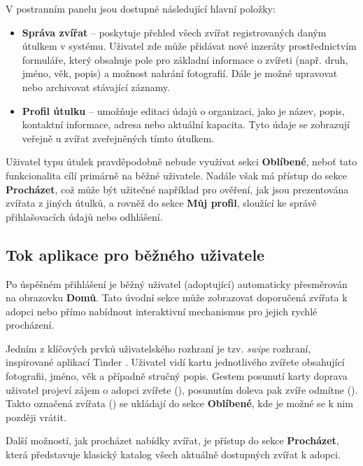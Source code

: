 \documentclass[czech, bp, kiv, he, iso690numb, pdf]{fasthesis}
\begin{document}
    \noindent V postranním panelu jsou dostupné následující hlavní položky:

    \begin{itemize}
        \item \textbf{Správa zvířat} – poskytuje přehled všech zvířat registrovaných daným útulkem v systému. Uživatel zde může přidávat nové inzeráty prostřednictvím formuláře, který obsahuje pole pro základní informace o zvířeti (např. druh, jméno, věk, popis) a možnost nahrání fotografií. Dále je možné upravovat nebo archivovat stávající záznamy.

        \item \textbf{Profil útulku} – umožňuje editaci údajů o organizaci, jako je název, popis, kontaktní informace, adresa nebo aktuální kapacita. Tyto údaje se zobrazují veřejně u zvířat zveřejněných tímto útulkem.
    \end{itemize}

    \noindent Uživatel typu útulek pravděpodobně nebude využívat sekci \textbf{Oblíbené}, neboť tato funkcionalita cílí primárně na běžné uživatele. Nadále však má přístup do sekce \textbf{Procházet}, což může být užitečné například pro ověření, jak jsou prezentována zvířata z jiných útulků, a rovněž do sekce \textbf{Můj profil}, sloužící ke správě přihlašovacích údajů nebo odhlášení.

    \subsection{Tok aplikace pro běžného uživatele}

    Po úspěšném přihlášení je běžný uživatel (adoptující) automaticky přesměrován na obrazovku \textbf{Domů}. Tato úvodní sekce může zobrazovat doporučená zvířata k adopci nebo přímo nabídnout interaktivní mechanismus pro jejich rychlé procházení.

    Jedním z klíčových prvků uživatelského rozhraní je tzv. \textit{swipe} rozhraní, inspirované aplikací Tinder \cite{tinder}. Uživatel vidí kartu jednotlivého zvířete obsahující fotografii, jméno, věk a případně stručný popis. Gestem posunutí karty doprava uživatel projeví zájem o adopci zvířete (), posunutím doleva pak zvíře odmítne (). Takto označená zvířata () se ukládají do sekce \textbf{Oblíbené}, kde je možné se k nim později vrátit.

    Další možností, jak procházet nabídky zvířat, je přístup do sekce \textbf{Procházet}, která představuje klasický katalog všech aktuálně dostupných zvířat k adopci.
\end{document}
